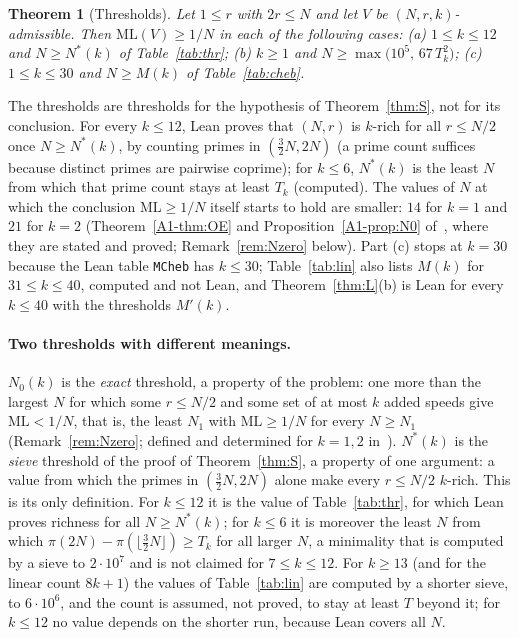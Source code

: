 \documentclass[11pt]{article}
\newtheorem{theorem}{Theorem}[section]
\theoremstyle{definition}
\theoremstyle{remark}
\newcommand{\ML}{\mathrm{ML}}
\newcommand{\xA}[1]{\ref{A1-#1}}
\begin{document}
\begin{theorem}[Thresholds]\label{thm:thr}
Let $1\le r$ with $2r\le N$ and let $V$ be $(N,r,k)$-admissible. Then $\ML(V)\ge1/N$ in each of the following cases: (a) $1\le k\le12$ and $N\ge N^*(k)$ of Table~\ref{tab:thr}; (b) $k\ge1$ and $N\ge\max\bigl(10^5,\,67\,T_k^2\bigr)$; (c) $1\le k\le30$ and $N\ge M(k)$ of Table~\ref{tab:cheb}.
\end{theorem}
The thresholds are thresholds for the hypothesis of Theorem~\ref{thm:S}, not for its conclusion. For every $k\le12$, Lean proves that $(N,r)$ is $k$-rich for all $r\le N/2$ once $N\ge N^*(k)$, by counting primes in $(\frac32N,2N)$ (a prime count suffices because distinct primes are pairwise coprime); for $k\le6$, $N^*(k)$ is the least $N$ from which that prime count stays at least $T_k$ (computed). The values of $N$ at which the conclusion $\ML\ge1/N$ itself starts to hold are smaller: $14$ for $k=1$ and $21$ for $k=2$ (Theorem~\xA{thm:OE} and Proposition~\xA{prop:N0} of~\cite{A1}, where they are stated and proved; Remark~\ref{rem:Nzero} below). Part (c) stops at $k=30$ because the Lean table \texttt{MCheb} has $k\le30$; Table~\ref{tab:lin} also lists $M(k)$ for $31\le k\le40$, computed and not Lean, and Theorem~\ref{thm:L}(b) is Lean for every $k\le40$ with the thresholds $M'(k)$.

\paragraph{Two thresholds with different meanings.}
$N_0(k)$ is the \emph{exact} threshold, a property of the problem: one more than the largest $N$ for which some $r\le N/2$ and some set of at most $k$ added speeds give $\ML<1/N$, that is, the least $N_1$ with $\ML\ge1/N$ for every $N\ge N_1$ (Remark~\ref{rem:Nzero}; defined and determined for $k=1,2$ in~\cite{A1}). $N^*(k)$ is the \emph{sieve} threshold of the proof of Theorem~\ref{thm:S}, a property of one argument: a value from which the primes in $(\frac32N,2N)$ alone make every $r\le N/2$ $k$-rich. This is its only definition. For $k\le12$ it is the value of Table~\ref{tab:thr}, for which Lean proves richness for all $N\ge N^*(k)$; for $k\le6$ it is moreover the least $N$ from which $\pi(2N)-\pi(\lfloor\frac32N\rfloor)\ge T_k$ for all larger $N$, a minimality that is computed by a sieve to $2\cdot10^7$ and is not claimed for $7\le k\le12$. For $k\ge13$ (and for the linear count $8k+1$) the values of Table~\ref{tab:lin} are computed by a shorter sieve, to $6\cdot10^6$, and the count is assumed, not proved, to stay at least $T$ beyond it; for $k\le12$ no value depends on the shorter run, because Lean covers all $N$.
\end{document}
